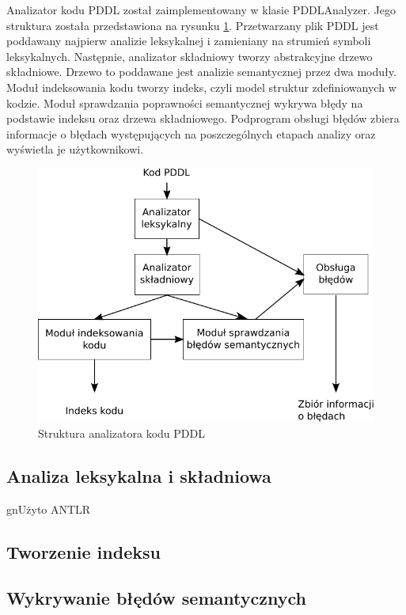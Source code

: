 Analizator kodu PDDL został zaimplementowany w klasie PDDLAnalyzer.
Jego struktura została przedstawiona na rysunku \ref{ana_structure}.
Przetwarzany plik PDDL jest poddawany najpierw analizie leksykalnej i zamieniany
na strumień symboli leksykalnych. Następnie, analizator składniowy tworzy abstrakcyjne
drzewo składniowe. Drzewo to poddawane jest analizie semantycznej przez dwa moduły.
Moduł indeksowania kodu tworzy indeks, czyli model struktur zdefiniowanych w kodzie.
Moduł sprawdzania poprawności semantycznej wykrywa błędy na podstawie indeksu oraz
drzewa składniowego. Podprogram obsługi błędów zbiera informacje o błędach występujących
na poszczególnych etapach analizy oraz wyświetla je użytkownikowi.

\begin{figure}[h]
  \centering
    \includegraphics{img/ana_structure.pdf}
    \caption{Struktura analizatora kodu PDDL}
    \label{ana_structure}
\end{figure}


\subsection{Analiza leksykalna i składniowa}
gnUżyto ANTLR

\subsection{Tworzenie indeksu}
\subsection{Wykrywanie błędów semantycznych}
